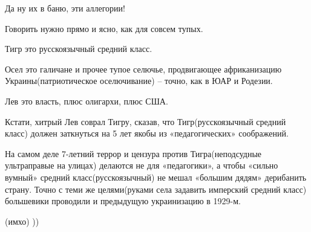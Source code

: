 \begin{itemize}
 

Да ну их в баню, эти аллегории!

Говорить нужно прямо и ясно, как для совсем тупых.

Тигр это русскоязычный средний класс.

Осел это галичане и прочее тупое селючье, продвигающее африканизацию
Украины(патриотическое оселючивание) – точно, как в ЮАР и Родезии.

Лев это власть, плюс олигархи, плюс США.

Кстати, хитрый Лев соврал Тигру, сказав, что Тигр(русскоязычный средний класс)
должен заткнуться на 5 лет якобы из «педагогических» соображений.

На самом деле 7-летний террор и цензура против Тигра(неподсудные ультраправые
на улицах) делаются не для «педагогики», а чтобы «сильно вумный» средний
класс(русскоязычный) не мешал «большим дядям» дерибанить страну. Точно с теми
же целями(руками села задавить имперский средний класс) большевики проводили и
предыдущую украинизацию в 1929-м.

(имхо) ))

\end{itemize}

